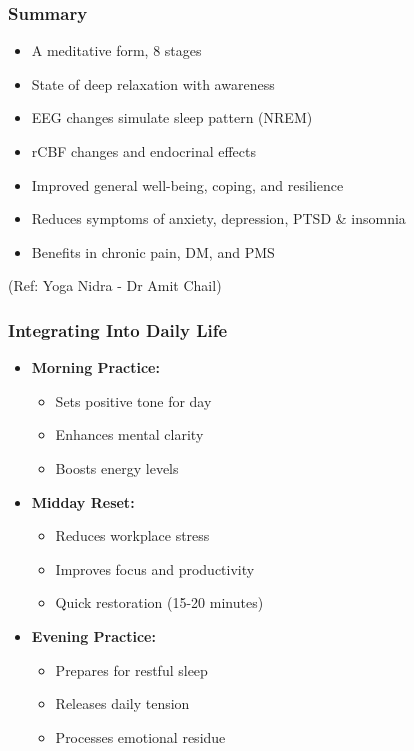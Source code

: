 \begin{frame}[fragile]\frametitle{Summary}


    \begin{itemize}
        \item A meditative form, 8 stages
        \item State of deep relaxation with awareness
        \item EEG changes simulate sleep pattern (NREM)
        \item rCBF changes and endocrinal effects
        \item Improved general well-being, coping, and resilience
        \item Reduces symptoms of anxiety, depression, PTSD \& insomnia
        \item Benefits in chronic pain, DM, and PMS
    \end{itemize}
	
		{\tiny (Ref: Yoga Nidra - Dr Amit Chail)}		

\end{frame}

\begin{frame}[fragile]\frametitle{Integrating Into Daily Life}
    \begin{itemize}
        \item \textbf{Morning Practice:}
        \begin{itemize}
            \item Sets positive tone for day
            \item Enhances mental clarity
            \item Boosts energy levels
        \end{itemize}
        \item \textbf{Midday Reset:}
        \begin{itemize}
            \item Reduces workplace stress
            \item Improves focus and productivity
            \item Quick restoration (15-20 minutes)
        \end{itemize}
        \item \textbf{Evening Practice:}
        \begin{itemize}
            \item Prepares for restful sleep
            \item Releases daily tension
            \item Processes emotional residue
        \end{itemize}
    \end{itemize}
\end{frame}

